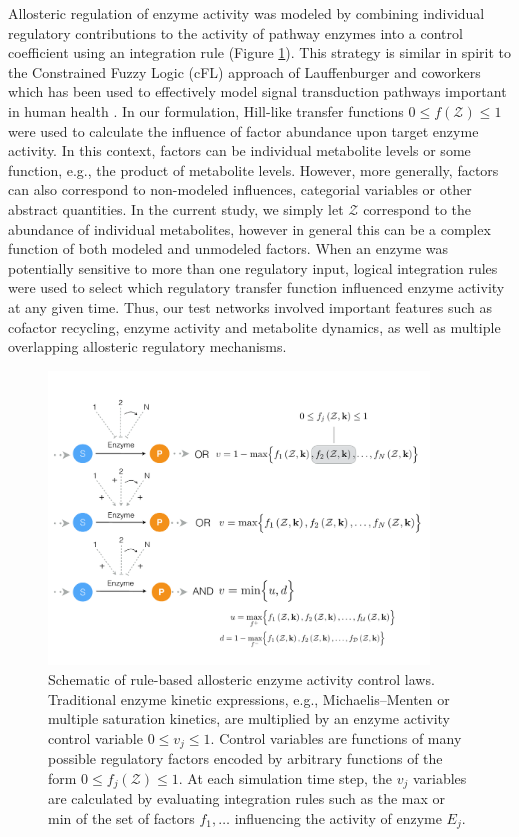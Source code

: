 \documentclass[processes,article,accept,moreauthors,pdftex,12pt,a4paper]{mdpi}
\begin{document}
Allosteric regulation of enzyme activity was modeled by combining individual regulatory \linebreak contributions to the activity of pathway enzymes into a control coefficient using an integration rule (Figure \ref{fig-control-schematic}).  
This strategy is similar in spirit to the Constrained Fuzzy Logic (cFL) approach of Lauffenburger and coworkers which has been used to effectively model signal transduction pathways important in human health \citep{Morris:2011aa}. 
In our formulation, Hill-like transfer functions $0 \leq f\left(\mathcal{Z}\right) \leq 1$ were used to calculate the influence of factor abundance upon target enzyme activity. 
In this context, factors can be individual metabolite levels or some function, e.g., the product of metabolite levels. 
However, more generally, factors can also correspond to non-modeled influences, categorial variables or other abstract quantities. 
In the current study, we simply let $\mathcal{Z}$ correspond to the abundance of individual metabolites, however in general this can be a complex function of both modeled and unmodeled factors. 
When an enzyme was potentially sensitive to more than one regulatory input, logical integration rules were used to select which regulatory transfer function influenced enzyme activity at any given time. 
Thus, our test networks involved important features such as cofactor recycling, enzyme activity and metabolite dynamics, as well as multiple overlapping allosteric regulatory mechanisms.  
\begin{figure}[H]
\centering
\includegraphics[width=0.9\textwidth]{./figs/Figure-2-ControlSchematic.pdf}
\caption{Schematic of rule-based allosteric enzyme activity control laws. 
Traditional enzyme kinetic expressions, e.g., Michaelis–Menten or multiple saturation kinetics, are multiplied by an enzyme activity control variable $0 \leq v_{j} \leq 1 $. 
Control variables are functions of many possible regulatory factors encoded by arbitrary functions of the form $0\leq f_{j}\left(\mathcal{Z}\right)\leq 1$.
At each simulation time step, the $v_{j}$ variables are calculated by evaluating integration rules such as the max or min of the set of factors $f_{1},\hdots$ 
influencing the activity of enzyme $E_{j}$. }\label{fig-control-schematic}
\end{figure}
\end{document}
